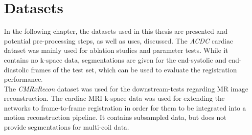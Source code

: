 \section{Datasets}	\label{Sec:Datasets}
In the following chapter, the datasets used in this thesis are presented and potential pre-processing steps, as well as uses, discussed. 
The \emph{ACDC} cardiac dataset was mainly used for ablation studies and parameter tests. While it contains no k-space data, segmentations are given for the end-systolic and end-diastolic frames of the test set, which can be used to evaluate the registration performance. \\
The \emph{CMRxRecon} dataset was used for the downstream-tests regarding MR image reconstruction. The cardiac MRI k-space data was used for extending the networks to frame-to-frame registration in order for them to be integrated into a motion reconstruction pipeline. It contains subsampled data, but does not provide segmentations for multi-coil data.

%


